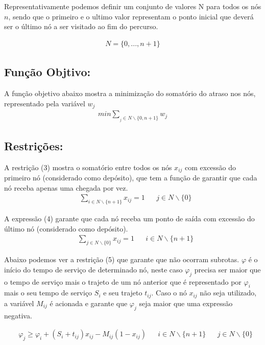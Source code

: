 \documentclass[12pt]{article}
\begin{document}
Representativamente podemos definir um conjunto de valores N para todos os nós $n$, sendo que o primeiro e o ultimo valor representam o ponto inicial que deverá ser o último nó a ser visitado ao fim do percurso.

\begin{align}
  N = \{0, ..., n+1\}
\end{align}

\subsection{Função Objtivo:}

A função objetivo abaixo mostra a minimização do somatório do atraso nos nós, representado pela variável $w_j$
\begin{align}
  min        \sum_{_j\in N\backslash \{0,n+1\}} w_j \label{eq1}
\end{align}

\subsection{Restrições:}

A restrição (3) mostra o somatório entre todos os nós $x_{ij}$ com excessão do primeiro nó (considerado como depósito), que tem a função de garantir que cada nó receba apenas uma chegada por vez.
\begin{align}
   & \sum_{i\in N\backslash \{n+1\}} x_{ij} = 1 &  & j\in N\backslash \{0\}
\end{align}

A expressão (4) garante que cada nó receba um ponto de saída com excessão do último nó (considerado como depósito).
\begin{align}
   & \sum_{j\in N\backslash \{0\}} x_{ij} = 1 &  & i\in N\backslash \{n+1\}
\end{align}

Abaixo podemos ver a restrição (5) que garante que não ocorram subrotas. $\varphi$ é o início do tempo de serviço de determinado nó, neste caso $\varphi_j$ precisa ser maior que o tempo de serviço mais o trajeto de um nó anterior que é representado por $\varphi_i$ mais o seu tempo de serviço $S_i$ e seu trajeto $t_{ij}$.
Caso o nó $x_{ij}$ não seja utilizado, a variável $M_{ij}$ é acionada e garante que $\varphi_j$ seja maior que uma expressão negativa.

\begin{align}
   & \varphi_j \geq \varphi_i + (S_i + t_{ij})x_{ij} - M_{ij}(1-x_{ij}) & \label{eq3} & i\in N\backslash \{n+1\} &  & j\in N\backslash \{0\}
\end{align}
\end{document}

